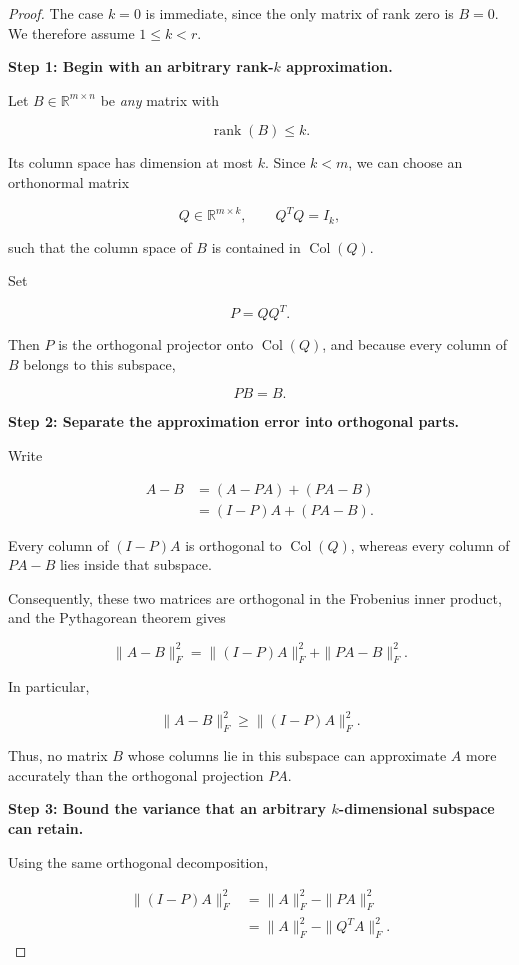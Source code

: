 \documentclass[11pt]{article}
\begin{document}
\begin{proof}

The case $k=0$ is immediate, since the
only matrix of rank zero is $B=0$.
We therefore assume $1\leq k<r$.

\textbf{Step 1: Begin with an arbitrary
rank-$k$ approximation.}

Let $B\in\mathbb{R}^{m\times n}$ be
\emph{any} matrix with

\[
\operatorname{rank}(B)\leq k.
\]

Its column space has dimension at
most $k$. Since $k<m$, we can choose
an orthonormal matrix

\[
Q\in\mathbb{R}^{m\times k},
\qquad Q^TQ=I_k,
\]

such that the column space of $B$
is contained in $\operatorname{Col}(Q)$.

Set

\[
P=QQ^T.
\]

Then $P$ is the orthogonal projector
onto $\operatorname{Col}(Q)$, and
because every column of $B$ belongs
to this subspace,

\[
\boxed{PB=B.}
\]

\textbf{Step 2: Separate the approximation
error into orthogonal parts.}

Write

\[
\begin{aligned}
A-B
&=(A-PA)+(PA-B)\\
&=(I-P)A+(PA-B).
\end{aligned}
\]

Every column of $(I-P)A$ is
orthogonal to $\operatorname{Col}(Q)$,
whereas every column of $PA-B$
lies inside that subspace.

Consequently, these two matrices
are orthogonal in the Frobenius
inner product, and the Pythagorean
theorem gives

\[
\boxed{
\|A-B\|_F^2
=\|(I-P)A\|_F^2
+\|PA-B\|_F^2.
}
\]

In particular,

\[
\boxed{
\|A-B\|_F^2\geq\|(I-P)A\|_F^2.
}
\]

Thus, no matrix $B$ whose columns
lie in this subspace can approximate
$A$ more accurately than the
orthogonal projection $PA$.

\textbf{Step 3: Bound the variance that
an arbitrary $k$-dimensional subspace
can retain.}

Using the same orthogonal decomposition,

\[
\begin{aligned}
\|(I-P)A\|_F^2
&=\|A\|_F^2-\|PA\|_F^2\\
&=\|A\|_F^2-\|Q^TA\|_F^2.
\end{aligned}
\]


\end{proof}
\end{document}

